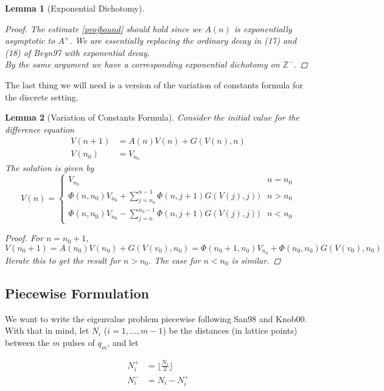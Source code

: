 \documentclass[12pt]{article}
\def\Z{{\mathbb Z}}
\newtheorem{lemma}{Lemma}
\begin{document}
\begin{lemma}[Exponential Dichotomy]
\begin{proof}
The estimate \eqref{projbound} should hold since we $A(n)$ is exponentially asymptotic to $A^+$. We are essentially replacing the ordinary decay in (17) and (18) of Beyn97 with exponential decay.\\

By the same argument we have a corresponding exponential dichotomy on $\Z^-$.

\end{proof}
\end{lemma}

The last thing we will need is a version of the variation of constants formula for the discrete setting.

\begin{lemma}[Variation of Constants Formula]\label{VOC}
Consider the initial value for the difference equation
\begin{align*}
V(n+1) &= A(n) V(n) + G(V(n), n) \\
V(n_0) &= V_{n_0}
\end{align*}
The solution is given by
\begin{equation}\label{VOCformula}
V(n) = 
\begin{cases}
V_{n_0} & n = n_0 \\
\Phi(n, n_0) V_{n_0} + \sum_{j = n_0}^{n-1} \Phi(n, j+1) G(V(j), j)) & n > n_0 \\
\Phi(n, n_0) V_{n_0} - \sum_{j = n}^{n_0-1} \Phi(n, j+1) G(V(j), j)) & n < n_0 

\end{cases}
\end{equation}

\begin{proof}
For $n = n_0 + 1$,
\[
V(n_0 + 1) = A(n_0) V(n_0) + G(V(v_0), n_0) = \Phi(n_0+1, n_0) V_{n_0} + \Phi(n_0, n_0) G(V(v_0), n_0)
\]
Iterate this to get the result for $n > n_0$. The case for $n < n_0$ is similar.
\end{proof}
\end{lemma}

\subsection{Piecewise Formulation}

We want to write the eigenvalue problem piecewise following San98 and Knob00. With that in mind, let $N_i$ ($i = 1, \dots, m-1$) be the distances (in lattice points) between the $m$ pulses of $q_m$, and let

\begin{align*}
N_i^+ &= \lfloor \frac{N_i}{2} \rfloor \\
N_i^- &= N_i - N_i^+
\end{align*}
\end{document}
